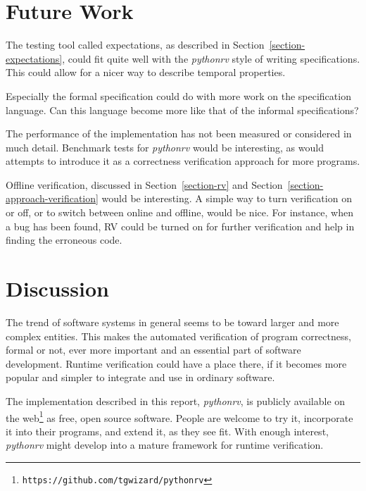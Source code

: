 \documentclass[a4paper,11pt]{kth-mag}
\begin{document}
\section{Future Work}

The testing tool called expectations, as described in
Section~\ref{section-expectations}, could fit quite well with the
\textit{pythonrv} style of writing specifications. This could allow for a nicer
way to describe temporal properties.

Especially the formal specification could do with more work on the
specification language. Can this language become more like that of the informal
specifications?

The performance of the implementation has not been measured or considered in
much detail. Benchmark tests for \textit{pythonrv} would be interesting, as
would attempts to introduce it as a correctness verification approach for more
programs.

Offline verification, discussed in Section~\ref{section-rv} and
Section~\ref{section-approach-verification} would be interesting. A simple way
to turn verification on or off, or to switch between online and offline, would
be nice. For instance, when a bug has been found, RV could be turned on for
further verification and help in finding the erroneous code.

\section{Discussion}

The trend of software systems in general seems to be toward larger and more
complex entities. This makes the automated verification of program
correctness, formal or not, ever more important and an essential part of
software development. Runtime verification could have a place there, if it
becomes more popular and simpler to integrate and use in ordinary software.

The implementation described in this report, \textit{pythonrv}, is publicly
available on the web\footnote{\texttt{https://github.com/tgwizard/pythonrv}} as
free, open source software. People are welcome to try it, incorporate it into
their programs, and extend it, as they see fit. With enough interest,
\textit{pythonrv} might develop into a mature framework for runtime
verification.




\end{document}
